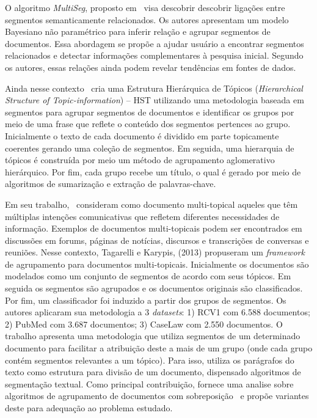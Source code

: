O algoritmo \textit{MultiSeg}, proposto em~\cite{Jeong:2010} visa descobrir descobrir ligações entre segmentos semanticamente relacionados. Os autores apresentam um modelo Bayesiano não paramétrico para inferir relação e agrupar segmentos de documentos. Essa abordagem se propõe a ajudar usuário a encontrar segmentos relacionados e detectar informações complementares à pesquisa inicial. Segundo os autores, essas relações ainda podem revelar tendências em fontes de dados.



Ainda nesse contexto~\cite{Cuong2011} cria uma Estrutura Hierárquica de Tópicos (\textit{Hierarchical Structure of Topic-information}) -- HST utilizando uma metodologia baseada em segmentos para agrupar segmentos de documentos e identificar os grupos por meio de uma frase que reflete o conteúdo dos segmentos pertences ao grupo.
Inicialmente o texto de cada documento é dividido em parte topicamente coerentes gerando uma coleção de segmentos. Em seguida, uma hierarquia de tópicos é construída por meio um método de agrupamento aglomerativo hierárquico. Por fim, cada grupo recebe um título, o qual é gerado por meio de algoritmos de sumarização e extração de palavras-chave.


Em seu trabalho,~\cite{Tagarelli2013} consideram como documento multi-topical aqueles que têm múltiplas intenções comunicativas que refletem diferentes necessidades de informação.
Exemplos de documentos multi-topicais podem ser encontrados em discussões em forums, páginas de notícias, discursos e transcrições de conversas e reuniões. Nesse contexto, Tagarelli e Karypis, (2013) propuseram um \textit{framework} de agrupamento para documentos multi-topicais. %
Inicialmente os documentos são modelados como um conjunto de segmentos de acordo com seus tópicos. Em seguida os segmentos são agrupados e os documentos originais são classificados. Por fim, um classificador foi induzido a partir dos grupos de segmentos.
Os autores aplicaram sua metodologia a 3 \textit{datasets}: 1) RCV1 com 6.588 documentos; 2) PubMed com 3.687 documentos; 3) CaseLaw com 2.550 documentos. 
O trabalho apresenta uma metodologia que utiliza segmentos de um determinado documento para facilitar a atribuição deste a mais de um grupo (onde cada grupo contém segmentos relevantes a um tópico). Para isso, utiliza os parágrafos do texto como estrutura para divisão de um documento, dispensado algoritmos de segmentação textual. Como principal contribuição, fornece uma analise sobre algoritmos de agrupamento de documentos com sobreposição~\cite{Zhao2004a, Zhao2004b, Dhillon2001} e propõe variantes deste para adequação ao problema estudado. 







